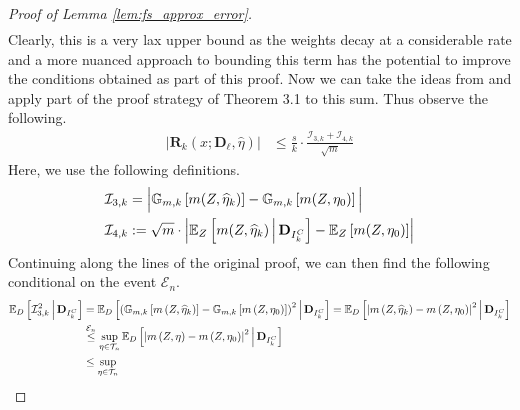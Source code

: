 \begin{proof}[Proof of Lemma \ref{lem:fs_approx_error}]
\begin{equation}
\begin{aligned}
        \end{aligned}
    \end{equation}
    Clearly, this is a very lax upper bound as the weights decay at a considerable rate and a more nuanced approach to bounding this term has the potential to improve the conditions obtained as part of this proof.
    Now we can take the ideas from \citet{chernozhukov_doubledebiased_2018} and apply part of the proof strategy of Theorem 3.1 to this sum.
    Thus observe the following.
    \begin{equation}
        \begin{aligned}
            \left| \mathbf{R}_{k}\left(x; \mathbf{D}_{\ell}, \hat{\eta}\right) \right| 
            & \leq \frac{s}{k} \cdot \frac{\mathcal{I}_{3,k} + \mathcal{I}_{4,k}}{\sqrt{m}}
        \end{aligned}
    \end{equation}
    Here, we use the following definitions.
    \begin{align}
        \mathcal{I}_{3,k} 
        & = \Big|\mathbb{G}_{m,k}\left[m(Z, \widehat{\eta}_{k})\right] 
        - \mathbb{G}_{m,k}\left[m(Z, \eta_{0})\right]\Big|\\
        \mathcal{I}_{4,k} 
        & := \sqrt{m} \cdot \left|
        \mathbb{E}_{Z}\left[m(Z, \widehat{\eta}_{k}) \, \middle| \, \mathbf{D}_{I_{k}^{C}}\right]
        - \mathbb{E}_{Z}\left[m(Z, \eta_{0}) \right]\right|
    \end{align}
    Continuing along the lines of the original proof, we can then find the following conditional on the event $\mathcal{E}_{n}$.
    \begin{equation}
        \begin{aligned}
            \E_{D}\left[\mathcal{I}_{3,k}^{2} \, \middle| \, \mathbf{D}_{I_{k}^{C}}\right]
            & = \E_{D}\left[ \left(\mathbb{G}_{m,k}\left[m\left(Z, \hat{\eta}_{k}\right)\right] 
            - \mathbb{G}_{m,k}\left[m\left(Z, \eta_{0}\right)\right]\right)^{2} \, \middle| \, \mathbf{D}_{I_{k}^{C}}\right]
            = \E_{D}\left[\left|m\left(Z, \hat{\eta}_{k}\right) - m\left(Z, \eta_{0}\right)\right|^{2}
            \, \middle| \, \mathbf{D}_{I_{k}^{C}}\right]\\
            & \overset{\mathcal{E}_{n}}{\leq} \sup_{\eta \in \mathcal{T}_{n}} 
             \E_{D}\left[\left|m\left(Z, \eta\right) - m\left(Z, \eta_{0}\right)\right|^{2}
            \, \middle| \, \mathbf{D}_{I_{k}^{C}}\right]\\
            & \leq \sup_{\eta \in \mathcal{T}_{n}} 

\end{aligned}
\end{equation}
\end{proof}
